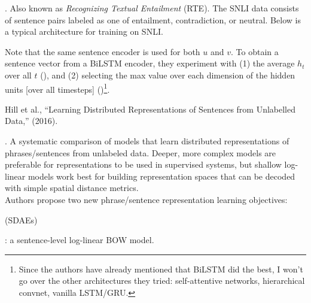 \documentclass[11pt]{article}
\begin{document}
\myspace
\p {}. Also known as \textit{Recognizing Textual Entailment} (RTE). The SNLI data consists of sentence pairs labeled as one of entailment, contradiction, or neutral. Below is a typical architecture for training on SNLI.


Note that the same sentence encoder is used for both $u$ and $v$. To obtain a sentence vector from a BiLSTM encoder, they experiment with (1) the average $h_t$ over all $t$ (), and (2) selecting the max value over each dimension of the hidden units [over all timesteps] ()\footnote{Since the authors have already mentioned that BiLSTM did the best, I won't go over the other architectures they tried: self-attentive networks, hierarchical convnet, vanilla LSTM/GRU.}.



\vspace{-1em}
{\footnotesize Hill et al., ``Learning Distributed Representations of Sentences from Unlabelled Data,'' (2016).}

\p {}. A systematic comparison of models that learn distributed representations of phrases/sentences from unlabeled data. Deeper, more complex models are preferable for representations to be used in supervised systems, but shallow log-linear models work best for building representation spaces that can be decoded with simple spatial distance metrics.\\

\p Authors propose two new phrase/sentence representation learning objectives:
\begin{compactenum}
	\item {} (SDAEs)
	
	\item {}: a sentence-level log-linear BOW model.
\end{compactenum}
\end{document}
